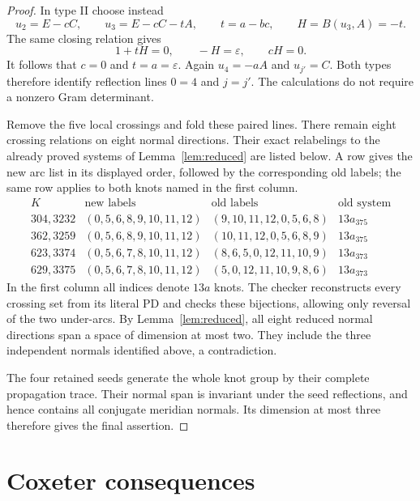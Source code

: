 \documentclass[11pt]{article}
\begin{document}
\begin{proof}
In type II choose instead
\[
 u_2=E-cC,\qquad u_3=E-cC-tA,\qquad t=a-bc,
 \qquad H=B(u_3,A)=-t.
\]
The same closing relation gives
\[
                   1+tH=0,\qquad -H=\varepsilon,
                   \qquad cH=0.
\]
It follows that $c=0$ and $t=a=\varepsilon$.
Again $u_4=-aA$ and $u_{j'}=C$.
Both types therefore identify reflection lines $0=4$ and $j=j'$.
The calculations do not require a nonzero Gram determinant.

Remove the five local crossings and fold these paired lines.
There remain eight crossing relations on eight normal directions.
Their exact relabelings to the already proved systems of
Lemma~\ref{lem:reduced} are listed below. A row gives the new arc
list in its displayed order, followed by the corresponding old labels;
the same row applies to both knots named in the first column.
\[
\begin{array}{c|c|c|c}
 K&\text{new labels}&\text{old labels}&\text{old system}\\\hline
304,3232&(0,5,6,8,9,10,11,12)&(9,10,11,12,0,5,6,8)&13a_{375}\\
362,3259&(0,5,6,8,9,10,11,12)&(10,11,12,0,5,6,8,9)&13a_{375}\\
623,3374&(0,5,6,7,8,10,11,12)&(8,6,5,0,12,11,10,9)&13a_{373}\\
629,3375&(0,5,6,7,8,10,11,12)&(5,0,12,11,10,9,8,6)&13a_{373}
\end{array}
\]
In the first column all indices denote $13a$ knots. The checker
reconstructs every crossing set from its literal PD and checks these
bijections, allowing only reversal of the two under-arcs.
By Lemma~\ref{lem:reduced}, all eight reduced normal directions span
a space of dimension at most two. They include the three independent
normals identified above, a contradiction.

The four retained seeds generate the whole knot group by their
complete propagation trace. Their normal span is invariant under the
seed reflections, and hence contains all conjugate meridian normals.
Its dimension at most three therefore gives the final assertion.
\end{proof}

\section{Coxeter consequences}
\end{document}
